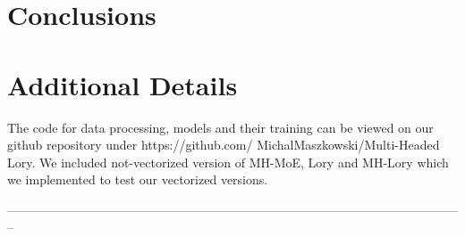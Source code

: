 \documentclass[12pt]{article}
\begin{document}
\section{Conclusions}



%


\printbibliography 

\appendix


\section{Additional Details}
The code for data processing, models and their training can be viewed on our github repository under https://github.com/
MichalMaszkowski/Multi-Headed Lory. We included not-vectorized version of MH-MoE, Lory and MH-Lory which we implemented to test our vectorized versions. 


% 
--------------------------------------------------------------------------------------------------------------
\end{document}
